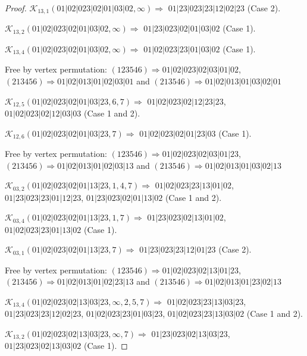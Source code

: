 \documentclass[12pt]{article}
\theoremstyle{plain}
\theoremstyle{definition}
\theoremstyle{remark}
\newcommand{\fancy}[1]{\mathcal{#1}}
\def\K{\fancy{K}}
\begin{document}
\begin{proof}
	$\K_{13,1}(01|02|023|02|01|03|02,\infty)\Rightarrow $ $01|23|023|23|12|02|23$ (Case 2).
	
	$\K_{13,2}(01|02|023|02|01|03|02,\infty)\Rightarrow $ $01|23|023|02|01|03|02$ (Case 1).
	
	$\K_{13,4}(01|02|023|02|01|03|02,\infty)\Rightarrow $ $01|02|023|23|01|03|02$ (Case 1).
	
	
	
	Free by vertex permutation: $(1 2 3 5 4 6)\Rightarrow 01|02|023|02|03|01|02$, $(2 1 3 4 5 6)\Rightarrow 01|02|013|01|02|03|01$ and $(2 1 3 5 4 6)\Rightarrow 01|02|013|01|03|02|01$
	
	
	
	\bigskip
	
	$\K_{12,5}(01|02|023|02|01|03|23,6, 7)\Rightarrow $ $01|02|023|02|12|23|23$, $01|02|023|02|12|03|03$ (Case 1 and 2).
	
	$\K_{12,6}(01|02|023|02|01|03|23,7)\Rightarrow $ $01|02|023|02|01|23|03$ (Case 1).
	
	
	
	Free by vertex permutation: $(1 2 3 5 4 6)\Rightarrow 01|02|023|02|03|01|23$, $(2 1 3 4 5 6)\Rightarrow 01|02|013|01|02|03|13$ and $(2 1 3 5 4 6)\Rightarrow 01|02|013|01|03|02|13$
	
	
	
	\bigskip
	
	$\K_{03,2}(01|02|023|02|01|13|23,1, 4, 7)\Rightarrow $ $01|02|023|23|13|01|02$, $01|23|023|23|01|12|23$, $01|23|023|02|01|13|02$ (Case 1 and 2).
	
	$\K_{03,4}(01|02|023|02|01|13|23,1, 7)\Rightarrow $ $01|23|023|02|13|01|02$, $01|02|023|23|01|13|02$ (Case 1).
	
	$\K_{03,1}(01|02|023|02|01|13|23,7)\Rightarrow $ $01|23|023|23|12|01|23$ (Case 2).
	
	
	
	Free by vertex permutation: $(1 2 3 5 4 6)\Rightarrow 01|02|023|02|13|01|23$, $(2 1 3 4 5 6)\Rightarrow 01|02|013|01|02|23|13$ and $(2 1 3 5 4 6)\Rightarrow 01|02|013|01|23|02|13$
	
	
	
	\bigskip
	
	$\K_{13,4}(01|02|023|02|13|03|23,\infty,2, 5, 7)\Rightarrow $ $01|02|023|23|13|03|23$, $01|23|023|23|12|02|23$, $01|02|023|23|01|03|23$, $01|02|023|23|13|03|02$ (Case 1 and 2).
	
	$\K_{13,2}(01|02|023|02|13|03|23,\infty,7)\Rightarrow $ $01|23|023|02|13|03|23$, $01|23|023|02|13|03|02$ (Case 1).
	

\end{proof}
\end{document}
